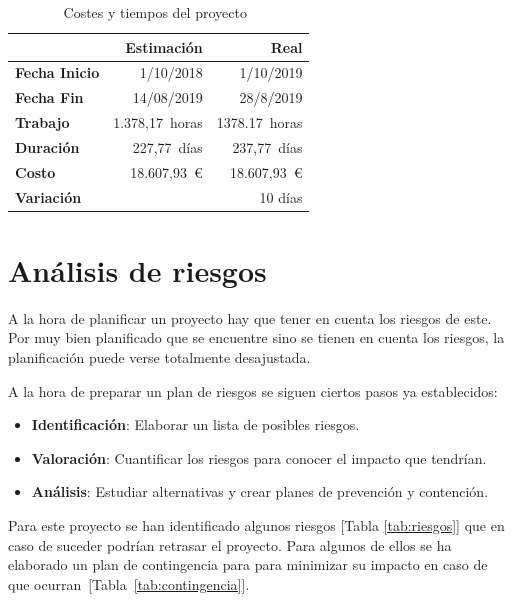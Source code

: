 \begin{table}[!h]
    \centering
    \begin{tabular}{ l r r }
        \toprule
        {} & Estimación & Real \\
        \midrule
        \textbf{Fecha Inicio}   & 1/10/2018         & 1/10/2019\\
        \textbf{Fecha Fin}      & 14/08/2019        & 28/8/2019 \\
        \textbf{Trabajo}        & 1.378,17~horas    & 1378.17~horas \\
        \textbf{Duración}       & 227,77~días       & 237,77~días \\
        \textbf{Costo}          & 18.607,93~\euro   & 18.607,93~\euro \\
        \textbf{Variación}      & {}                & 10 días \\ 
        \bottomrule
    \end{tabular}
    \caption[Costes y tiempos del proyecto]{Costes y tiempos del proyecto~\protect\footnotemark}
    
    \label{tab:project_cost}
\end{table}


\section{Análisis de riesgos}
A la hora de planificar un proyecto hay que tener en cuenta los riesgos de este. Por muy bien planificado que se encuentre sino se tienen en cuenta los riesgos, la planificación puede verse totalmente desajustada.

A la hora de preparar un plan de riesgos se siguen ciertos pasos ya establecidos:
\begin{itemize}
    \item \textbf{Identificación}: Elaborar un lista de posibles riesgos.
    \item \textbf{Valoración}: Cuantificar los riesgos para conocer el impacto que tendrían.
    \item \textbf{Análisis}: Estudiar alternativas y crear planes de prevención y contención.
\end{itemize}

Para este proyecto se han identificado algunos riesgos [Tabla \ref{tab:riesgos}] que en caso de suceder podrían retrasar el proyecto. Para algunos de ellos se ha elaborado un plan de contingencia para para minimizar su impacto en caso de que ocurran~[Tabla~\ref{tab:contingencia}]. 

